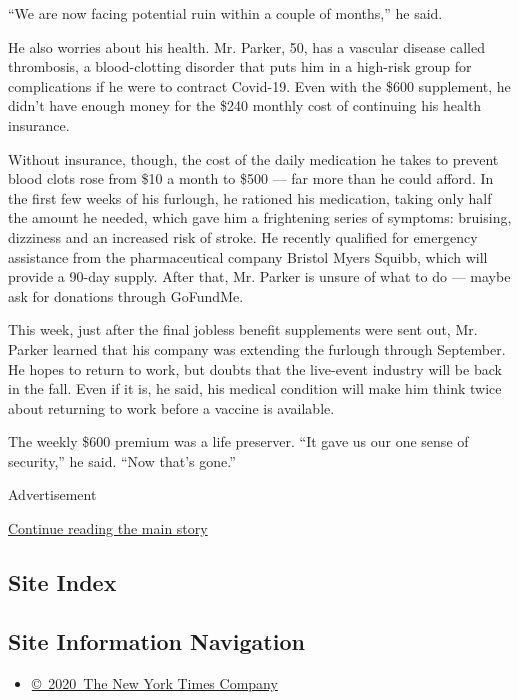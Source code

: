 ``We are now facing potential ruin within a couple of months,'' he said.

He also worries about his health. Mr. Parker, 50, has a vascular disease
called thrombosis, a blood-clotting disorder that puts him in a
high-risk group for complications if he were to contract Covid-19. Even
with the \$600 supplement, he didn't have enough money for the \$240
monthly cost of continuing his health insurance.

Without insurance, though, the cost of the daily medication he takes to
prevent blood clots rose from \$10 a month to \$500 --- far more than he
could afford. In the first few weeks of his furlough, he rationed his
medication, taking only half the amount he needed, which gave him a
frightening series of symptoms: bruising, dizziness and an increased
risk of stroke. He recently qualified for emergency assistance from the
pharmaceutical company Bristol Myers Squibb, which will provide a 90-day
supply. After that, Mr. Parker is unsure of what to do --- maybe ask for
donations through GoFundMe.

This week, just after the final jobless benefit supplements were sent
out, Mr. Parker learned that his company was extending the furlough
through September. He hopes to return to work, but doubts that the
live-event industry will be back in the fall. Even if it is, he said,
his medical condition will make him think twice about returning to work
before a vaccine is available.

The weekly \$600 premium was a life preserver. ``It gave us our one
sense of security,'' he said. ``Now that's gone.''

Advertisement

\protect\hyperlink{after-bottom}{Continue reading the main story}

\hypertarget{site-index}{%
\subsection{Site Index}\label{site-index}}

\hypertarget{site-information-navigation}{%
\subsection{Site Information
Navigation}\label{site-information-navigation}}

\begin{itemize}
\tightlist
\item
  \href{https://help.nytimes3xbfgragh.onion/hc/en-us/articles/115014792127-Copyright-notice}{©~2020~The
  New York Times Company}
\end{itemize}

